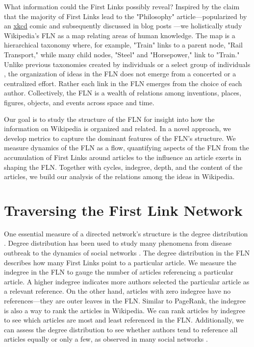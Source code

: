 \documentclass[pre,twocolumn,twoside,superscriptaddress,floatfix, aps, 10pt]{revtex4-1}
\begin{document}
What information could the First Links possibly reveal?
Inspired by the claim that the majority of First Links lead to the 
"Philosophy" article---popularized by an 
\href{https://xkcd.com/903/}{xkcd}
comic and subsequently
discussed in blog posts 
\cite{mat_blog, Ilmari_first_links, xkcd}
---we holistically study 
Wikipedia's FLN as a map relating areas of human knowledge. 
The map is a hierarchical taxonomy where, for example, "Train" links to a parent node, 
"Rail Transport," while many child nodes, "Steel" and "Horsepower," link to 
"Train." Unlike previous taxonomies
created by individuals
\cite{locke, descartes, aristotle}
or a select group of individuals 
\cite{hist_thesaurus}, 
the organization of ideas in the FLN 
does not emerge from a concerted or a centralized effort. 
Rather each link in the FLN emerges from the choice of each author.
Collectively, the FLN is a wealth of relations among inventions, places,
figures, objects, and events across space and time.


Our goal is to study the structure of the FLN for insight into how the information on Wikipedia is organized and related.
In a novel approach, we develop metrics to capture 
the dominant features of the FLN's structure.
We measure dynamics of the FLN as a flow, quantifying 
aspects of the FLN from the accumulation of First Links around articles 
to the influence an article exerts in shaping the FLN.
Together with cycles, indegree, depth, and the content of the articles, 
we build our analysis of the relations among the ideas in Wikipedia.


\section{Traversing the First Link Network}

One essential measure of a directed network's structure is the degree distribution 
\cite{newman}. 
Degree distribution has been used to study many phenomena from disease outbreak 
\cite{disease} 
to the dynamics of social networks 
\cite{social_nets}.
The degree distribution in the FLN describes how many First Links point to a 
particular article. 
We measure the indegree in the FLN to gauge the number of articles referencing a particular article.
A higher indegree indicates more authors selected the particular article
as a relevant reference. On the other hand, articles with zero 
indegree have no references---they are outer leaves in the FLN. 
Similar to PageRank, the indegree is also a way to rank the articles in Wikipedia.
We can rank articles by indegree to see which articles are most and least referenced in the FLN. 
Additionally, we can assess the degree distribution to see whether authors tend to reference all articles
equally or only a few, as observed in many social networks \cite{social_nets}.
\end{document}

